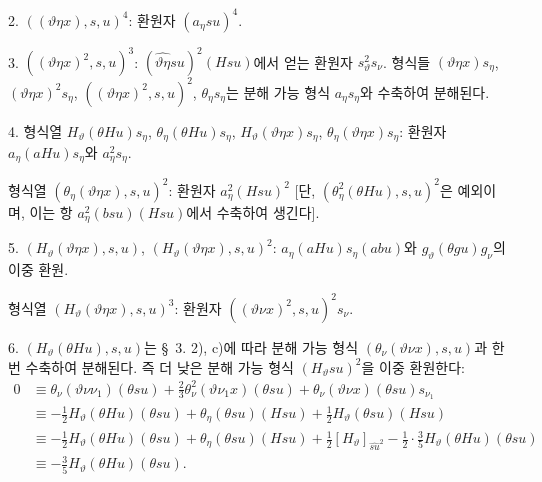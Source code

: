 2. $((\vartheta\eta x),s,u)^4$: 환원자 $(a_\eta su)^4$.

3. $((\vartheta\eta x)^2,s,u)^3$: $(\widehat{\vartheta\eta}su)^2(Hsu)$에서 얻는 환원자 $s_\vartheta^2s_\nu$.
형식들 $(\vartheta\eta x)s_\eta$, $(\vartheta\eta x)^2s_\eta$, $((\vartheta\eta x)^2,s,u)^2$, $\theta_\eta s_\eta$는 분해 가능 형식 $a_\eta s_\eta$와 수축하여 분해된다.

4. 형식열 $H_\vartheta(\theta Hu)s_\eta$, $\theta_\eta(\theta Hu)s_\eta$, $H_\vartheta(\vartheta\eta x)s_\eta$, $\theta_\eta(\vartheta\eta x)s_\eta$:
환원자 $a_\eta(aHu)s_\eta$와 $a_\eta^2s_\eta$.

형식열 $(\theta_\eta(\vartheta\eta x),s,u)^2$: 환원자 $a_\eta^2(Hsu)^2$ [단, $(\theta_\eta^2(\theta Hu),s,u)^2$은 예외이며, 이는 항 $a_\eta^2(bsu)(Hsu)$에서 수축하여 생긴다].

5. $(H_\vartheta(\vartheta\eta x),s,u)$, $(H_\vartheta(\vartheta\eta x),s,u)^2$: $a_\eta(aHu)s_\eta(abu)$와 $g_\vartheta(\theta gu)g_\nu$의 이중 환원.

형식열 $(H_\vartheta(\vartheta\eta x),s,u)^3$: 환원자 $((\vartheta \nu x)^2,s,u)^2s_\nu$.

6. $(H_\vartheta(\theta Hu),s,u)$는 \S\ 3. 2), c)에 따라 분해 가능 형식 $(\theta_\nu(\vartheta \nu x),s,u)$과 한 번 수축하여 분해된다. 즉 더 낮은 분해 가능 형식 $(H_\vartheta su)^2$을 이중 환원한다:
\[
\begin{aligned}
0&\equiv \theta_\nu(\vartheta\nu\nu_1)(\theta su)+\frac23\theta_\nu^2(\vartheta \nu_1 x)(\theta su)+\theta_\nu(\vartheta \nu x)(\theta su)s_{\nu_1}\\
&\equiv -\frac12H_\vartheta(\theta Hu)(\theta su)+\theta_\eta(\theta su)(Hsu)+\frac12H_\vartheta(\theta su)(Hsu)\\
&\equiv -\frac12H_\vartheta(\theta Hu)(\theta su)+\theta_\eta(\theta su)(Hsu)+\frac12[H_\vartheta]_{\widehat{su}^2}-\frac12\cdot\frac35H_\vartheta(\theta Hu)(\theta su)\\
&\equiv -\frac35H_\vartheta(\theta Hu)(\theta su).
\end{aligned}
\]

